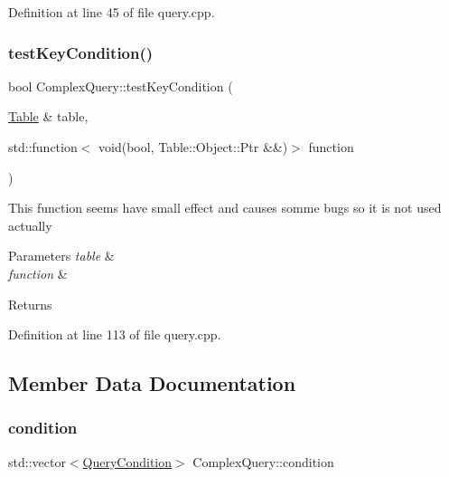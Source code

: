 Definition at line 45 of file query.\+cpp.

\mbox{\label{class_complex_query_a111c6bb74ca841541a89c68c4e6a641f}} 
\subsubsection{\texorpdfstring{test\+Key\+Condition()}{testKeyCondition()}}
{\footnotesize\ttfamily bool Complex\+Query\+::test\+Key\+Condition (\begin{DoxyParamCaption}\item[{\hyperlink{class_table}{Table} \&}]{table,  }\item[{std\+::function$<$ void(bool, Table\+::\+Object\+::\+Ptr \&\&)$>$}]{function }\end{DoxyParamCaption})}

This function seems have small effect and causes somme bugs so it is not used actually 
\begin{DoxyParams}{Parameters}
{\em table} & \\
\hline
{\em function} & \\
\hline
\end{DoxyParams}
\begin{DoxyReturn}{Returns}

\end{DoxyReturn}


Definition at line 113 of file query.\+cpp.



\subsection{Member Data Documentation}
\mbox{\label{class_complex_query_ac65a30ad8b99278b03d6a64ad34a8a75}} 
\subsubsection{\texorpdfstring{condition}{condition}}
{\footnotesize\ttfamily std\+::vector$<$\hyperlink{struct_query_condition}{Query\+Condition}$>$ Complex\+Query\+::condition\hspace{0.3cm}{\ttfamily [protected]}}


